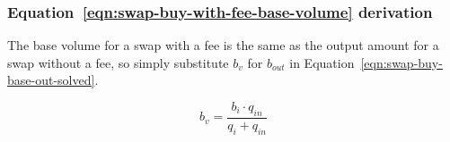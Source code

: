 \subsubsection{Equation~\ref{eqn:swap-buy-with-fee-base-volume} derivation}%
\label{sssec:equation-eqn-swap-buy-with-fee-base-volume-derivation}

The base volume for a swap with a fee is the same as the output amount for a swap
without a fee, so simply substitute $b_v$ for $b_{out}$ in
Equation~\ref{eqn:swap-buy-base-out-solved}.

\begin{equation}
	b_v = \frac{b_i \cdot q_{in}}{q_i + q_{in}} \nonumber
\end{equation}
